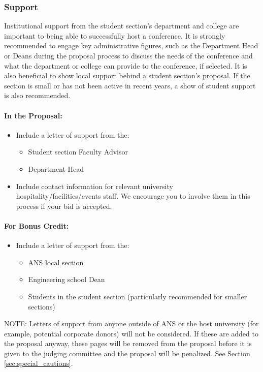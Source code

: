 \documentclass[12pt]{article}
\begin{document}
\subsubsection{Support}
Institutional support from the student section's department and college are important to being able to successfully host a conference.
It is strongly recommended to engage key administrative figures, such as the Department Head or Deans during the proposal process to discuss the needs of the conference and what the department or college can provide to the conference, if selected.
It is also beneficial to show local support behind a student section’s proposal.
If the section is small or has not been active in recent years, a show of student support is also
recommended.

\paragraph{In the Proposal:}
\begin{itemize}
\item Include a letter of support from the:
\begin{itemize}
\item{Student section Faculty Advisor}
\item{Department Head}
\end{itemize}
\item{Include contact information for relevant university hospitality/facilities/events staff. We encourage you to involve them in this process if your bid is accepted.}
\end{itemize}

\paragraph{For Bonus Credit:}
\begin{itemize}
\item{Include a letter of support from the:
\begin{itemize}
\item{ANS local section}
\item{Engineering school Dean}
\item{Students in the student section (particularly recommended for smaller sections)}
\end{itemize}
}
\end{itemize}

NOTE: Letters of support from anyone outside of ANS or the host university (for example,
potential corporate donors) will not be considered. If these are added to the
proposal anyway, these pages will be removed from the proposal before it is given to
the judging committee and the proposal will be penalized. See Section \ref{sec:special_cautions}.
\end{document}
